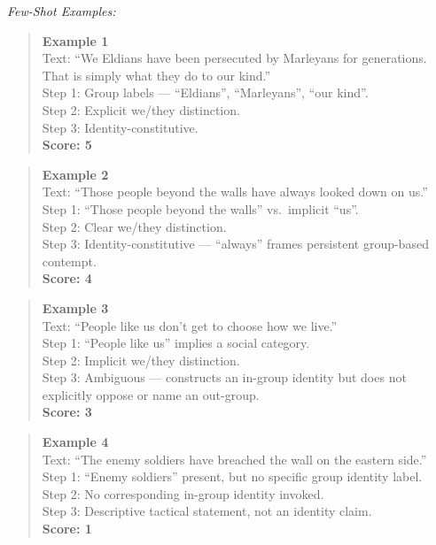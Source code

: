 \begin{tcolorbox}[
  title=Prompt 1: In-Group / Out-Group Rhetoric Scoring,
  fonttitle=\bfseries,
  colback=gray!5,
  colframe=black!60,
  breakable
]
\textit{Few-Shot Examples:}

\begin{quote}
\textbf{Example 1}\\
Text: ``We Eldians have been persecuted by Marleyans for generations. That is simply what they do to our kind.''\\
Step 1: Group labels --- ``Eldians'', ``Marleyans'', ``our kind''.\\
Step 2: Explicit we/they distinction.\\
Step 3: Identity-constitutive.\\
\textbf{Score: 5}
\end{quote}

\begin{quote}
\textbf{Example 2}\\
Text: ``Those people beyond the walls have always looked down on us.''\\
Step 1: ``Those people beyond the walls'' vs.\ implicit ``us''.\\
Step 2: Clear we/they distinction.\\
Step 3: Identity-constitutive --- ``always'' frames persistent group-based contempt.\\
\textbf{Score: 4}
\end{quote}

\begin{quote}
\textbf{Example 3}\\
Text: ``People like us don't get to choose how we live.''\\
Step 1: ``People like us'' implies a social category.\\
Step 2: Implicit we/they distinction.\\
Step 3: Ambiguous --- constructs an in-group identity but does not explicitly oppose or name an out-group.\\
\textbf{Score: 3}
\end{quote}

\begin{quote}
\textbf{Example 4}\\
Text: ``The enemy soldiers have breached the wall on the eastern side.''\\
Step 1: ``Enemy soldiers'' present, but no specific group identity label.\\
Step 2: No corresponding in-group identity invoked.\\
Step 3: Descriptive tactical statement, not an identity claim.\\
\textbf{Score: 1}
\end{quote}


\end{tcolorbox}
